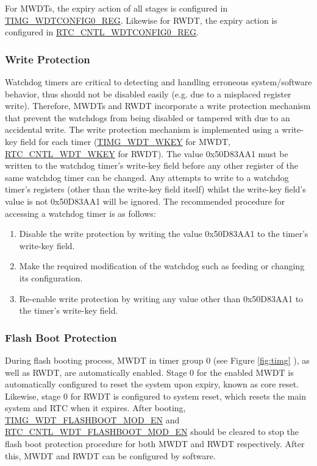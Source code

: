 \documentclass[main\_\_EN.tex]{subfiles}
\begin{document}
For MWDTs, the expiry action of all stages is configured in \hyperref[regdesc:TIMGWDTCONFIG0REG]{TIMG\_WDTCONFIG0\_REG}. Likewise for RWDT, the expiry action is configured in \hyperref[regdesc:RTCCNTLWDTCONFIG0REG]{RTC\_CNTL\_WDTCONFIG0\_REG}.

\subsubsection{Write Protection}
Watchdog timers are critical to detecting and handling erroneous system/software behavior, thus should not be disabled easily (e.g. due to a misplaced register write). Therefore, MWDTs and RWDT incorporate a write protection mechanism that prevent the watchdogs from being disabled or tampered with due to an accidental write.
The write protection mechanism is implemented using a write-key field for each timer (\hyperref[fielddesc:TIMGWDTWKEY]{TIMG\_WDT\_WKEY} for  MWDT, \hyperref[fielddesc:RTCCNTLWDTWKEY]{RTC\_CNTL\_WDT\_WKEY} for RWDT). The value 0x50D83AA1 must be written to the watchdog timer's write-key field before any other register of the same watchdog timer can be changed. Any attempts to write to a watchdog timer's registers (other than the write-key field itself) whilst the write-key field's value is not 0x50D83AA1 will be ignored. The recommended procedure for accessing a watchdog timer is as follows:
\begin{enumerate}
\item Disable the write protection by writing the value 0x50D83AA1 to the timer's write-key field.
\item Make the required modification of the watchdog such as feeding or changing its configuration.
\item Re-enable write protection by writing any value other than 0x50D83AA1 to the timer's write-key field.
\end{enumerate}

\subsubsection{Flash Boot Protection}
During flash booting process, MWDT in timer group 0 (see Figure \ref{fig:timg} \textit{}), as well as RWDT, are automatically enabled. Stage 0 for the enabled MWDT is automatically configured to reset the system upon expiry, known as core reset. Likewise, stage 0 for RWDT is configured to system reset, which resets the main system and RTC when it expires. After booting, \hyperref[fielddesc:TIMGWDTFLASHBOOTMODEN]{TIMG\_WDT\_FLASHBOOT\_MOD\_EN} and \hyperref[fielddesc:RTCCNTLWDTFLASHBOOTMODEN]{RTC\_CNTL\_WDT\_FLASHBOOT\_MOD\_EN} should be cleared to stop the flash boot protection procedure for both MWDT and RWDT respectively. After this, MWDT and RWDT can be configured by software.
\end{document}
